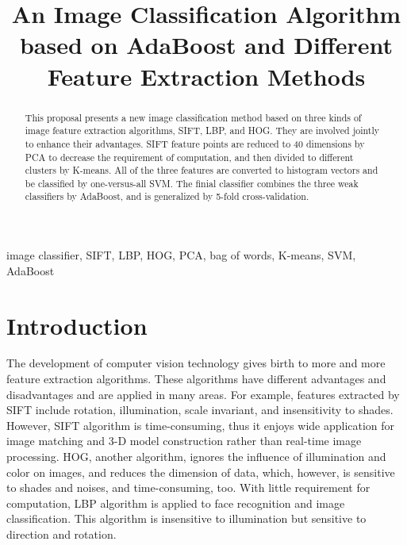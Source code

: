 \documentclass[conference]{IEEEtran}
\begin{document}
\title{An Image Classification Algorithm based on AdaBoost and Different Feature Extraction Methods\\
}

\author{
\and
{}
}

\maketitle

\begin{abstract}
This proposal presents a new image classification method based on three kinds of image feature extraction algorithms, SIFT, LBP, and HOG. They are involved jointly to enhance their advantages. SIFT feature points are reduced to 40 dimensions by PCA to decrease the requirement of computation, and then divided to different clusters by K-means. All of the three features are converted to histogram vectors and be classified by one-versus-all SVM. The finial classifier combines the three weak classifiers by AdaBoost, and is generalized by 5-fold cross-validation.
\end{abstract}

\begin{IEEEkeywords}
image classifier, SIFT, LBP, HOG, PCA, bag of words, K-means, SVM, AdaBoost 
\end{IEEEkeywords}

\section{Introduction}The development of computer vision technology gives birth to more and more feature extraction algorithms. These algorithms have different advantages and disadvantages and are applied in many areas. For example, features extracted by SIFT\cite{sift} include rotation, illumination, scale invariant, and insensitivity to shades. However, SIFT algorithm is time-consuming, thus it enjoys wide application for image matching and 3-D model construction rather than real-time image processing. HOG\cite{hog}, another algorithm, ignores the influence of illumination and color on images, and reduces the dimension of data, which, however, is sensitive to shades and noises, and time-consuming, too. With little requirement for computation, LBP algorithm is applied to face recognition and image classification. This algorithm is insensitive to illumination but sensitive to direction and rotation. 
\end{document}
